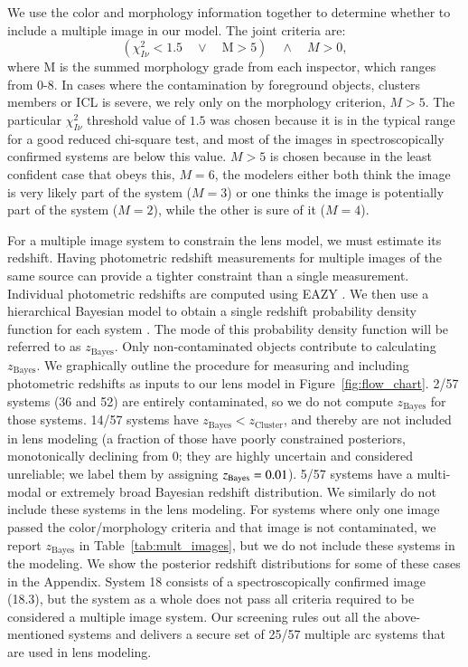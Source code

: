 We use the color and morphology information together to determine whether to include a multiple image in our
model. The joint criteria are: \begin{equation} (\chi^2_{I \nu} < 1.5 \quad \lor \quad \textrm{M} > 5) \quad
\land \quad M>0, \end{equation} where M is the summed morphology grade from each inspector, which ranges from
0-8. In cases where the contamination by foreground objects, clusters members or ICL is severe, we rely only on
the morphology criterion, $M>5$. The particular $\chi^2_{I \nu}$ threshold value of $1.5$ was chosen because it
is in the typical range for a good reduced chi-square test, and most of the images in spectroscopically confirmed
systems are below this value. $M>5$ is chosen because in the least confident case that obeys this, $M=6$, the
modelers either both think the image is very likely part of the system ($M=3$) or one thinks the image is
potentially part of the system ($M=2$), while the other is sure of it ($M=4$). 

For a multiple image system to constrain the lens model, we must
estimate its redshift. Having photometric redshift measurements for
multiple images of the same source can provide a tighter constraint
than a single measurement. Individual photometric redshifts are
computed using EAZY \citep{Brammer:2008p13280}. We then use a
hierarchical Bayesian model to obtain a single redshift probability
density function for each system \citep{Dahlen:2013p33380}. The mode
of this probability density function will be referred to as
$z_{\textrm{Bayes}}$. Only non-contaminated objects contribute to
calculating $z_{\textrm{Bayes}}$. We graphically outline the procedure
for measuring and including photometric redshifts as inputs to our
lens model in Figure~\ref{fig:flow_chart}. 2/57 systems (36 and 52) are
entirely contaminated, so we do not compute $z_{\textrm{Bayes}}$ for
those systems. 14/57 systems have $z_{\textrm{Bayes}} <
z_{\textrm{Cluster}}$, and thereby are not included in lens modeling (a
fraction of those have poorly constrained posteriors, monotonically
declining from 0; they are highly uncertain and considered unreliable;
we label them by assigning $z_{\rm Bayes}=0.01$). 5/57 systems have a
multi-modal or extremely broad Bayesian redshift distribution. We similarly do
not include these systems in the lens modeling. For systems where only one image passed the
color/morphology criteria and that image is not contaminated, we report
$z_{\textrm{Bayes}}$ in Table~\ref{tab:mult_images}, but we do not
include these systems in the modeling. We show the posterior redshift
distributions for some of these cases in the Appendix. System 18
consists of a spectroscopically confirmed image (18.3), but the system as
a whole does not pass all criteria required to be considered a
multiple image system. Our screening rules out all the above-mentioned
systems and delivers a secure set of 25/57 multiple arc systems that
are used in lens modeling.

